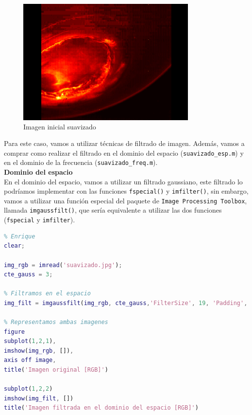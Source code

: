 \documentclass[12pt]{article}
\begin{document}
	\begin{figure}[h]
		\begin{center}
			\includegraphics[width=0.8\textwidth]{img/suavizado.jpg}
			\caption{Imagen inicial suavizado}
			\label{img: suavizado src}
		\end{center}
	\end{figure}

	\noindent Para este caso, vamos a utilizar técnicas de filtrado de imagen. Además, vamos a comprar como realizar el filtrado en el dominio del espacio (\texttt{suavizado\_esp.m}) y en el dominio de la frecuencia (\texttt{suavizado\_freq.m}). \\
	
	\noindent \textbf{\large Dominio del espacio} \\
	
	\noindent En el dominio del espacio, vamos a utilizar un filtrado gaussiano, este filtrado lo podríamos implementar con las funciones \texttt{fspecial()} y \texttt{imfilter()}, sin embargo, vamos a utilizar una función especial del paquete de \texttt{Image Processing Toolbox}, llamada \texttt{imgaussfilt()}, que sería equivalente a utilizar las dos funciones (\texttt{fspecial} y \texttt{imfilter}).
	
	\begin{lstlisting}[language=Matlab, caption={Implementación de suavizado en el dominio espacial en \texttt{MATLAB}}]
% 4 - Suavizado
% Enrique
clear;

img_rgb = imread('suavizado.jpg');
cte_gauss = 3;

% Filtramos en el espacio
img_filt = imgaussfilt(img_rgb, cte_gauss,'FilterSize', 19, 'Padding', 'circular');

% Representamos ambas imagenes
figure
subplot(1,2,1),
imshow(img_rgb, []),
axis off image,
title('Imagen original [RGB]')

subplot(1,2,2)
imshow(img_filt, [])
title('Imagen filtrada en el dominio del espacio [RGB]')
	\end{lstlisting}
\end{document}
